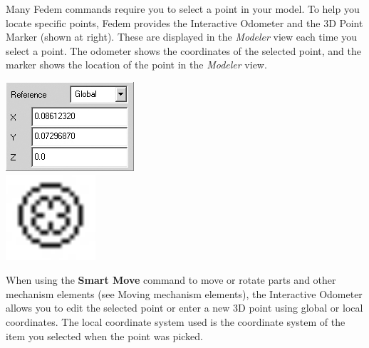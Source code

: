 \noindent
\begin{minipage}{0.77\textwidth}
  \raggedright
  Many Fedem commands require you to select a point in your model.
  To help you locate specific points, Fedem provides the Interactive Odometer
  and the 3D Point Marker (shown at right).
  These are displayed in the {\sl Modeler} view each time you select a point.
  The odometer shows the coordinates of the selected point, and the
  marker shows the location of the point in the {\sl Modeler} view.
\end{minipage}%
\hfill\begin{minipage}{0.2\textwidth}
  \center
  \includegraphics[width=\textwidth]{Figures/3-odometer} \\[2mm]
  \includegraphics[width=0.25\textwidth]{Figures/3d_point_marker}
\end{minipage}

When using the \textbf{Smart Move} command to move or rotate parts and other
mechanism elements (see 
{Moving mechanism elements}), the Interactive Odometer allows you to edit the
selected point or enter a new 3D point using global or local coordinates.
The local coordinate system used is the coordinate system of the item you
selected when the point was picked.

